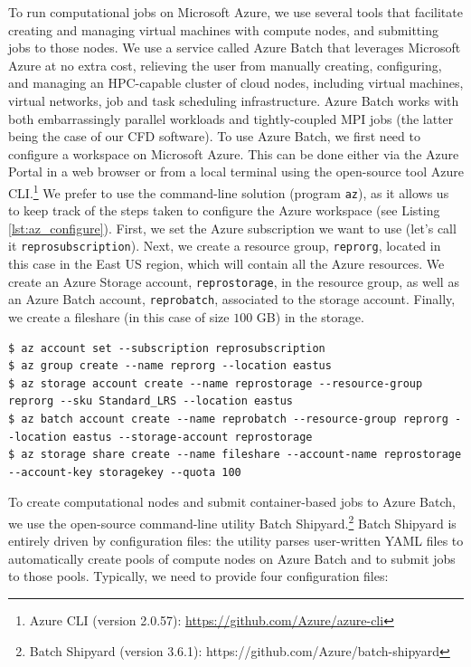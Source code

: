 \documentclass[10pt,journal,compsoc]{IEEEtran}
\begin{document}
To run computational jobs on Microsoft Azure, we use several tools that facilitate creating and managing virtual machines with compute nodes, and submitting jobs to those nodes.
We use a service called Azure Batch that leverages Microsoft Azure at no extra cost, relieving the user from manually creating, configuring, and managing an HPC-capable cluster of cloud nodes, including virtual machines, virtual networks, job and task scheduling infrastructure.
Azure Batch works with both embarrassingly parallel workloads and tightly-coupled MPI jobs (the latter being the case of our CFD software).
To use Azure Batch, we first need to configure a workspace on Microsoft Azure.
This can be done either via the Azure Portal in a web browser or from a local terminal using the open-source tool Azure CLI.\footnote{Azure CLI (version 2.0.57): \url{https://github.com/Azure/azure-cli}}
We prefer to use the command-line solution (program \texttt{az}), as it allows us to keep track of the steps taken to configure the Azure workspace (see Listing \ref{lst:az_configure}).
First, we set the Azure subscription we want to use (let's call it \texttt{reprosubscription}).
Next, we create a resource group, \texttt{reprorg}, located in this case in the East US region, which will contain all the Azure resources.
We create an Azure Storage account, \texttt{reprostorage}, in the resource group, as well as an Azure Batch account, \texttt{reprobatch}, associated to the storage account.
Finally, we create a fileshare (in this case of size $100$ GB) in the storage.

\begin{lstlisting}[label=lst:az_configure,caption={Configure the workspace on Microsoft Azure.}]
$ az account set --subscription reprosubscription
$ az group create --name reprorg --location eastus
$ az storage account create --name reprostorage --resource-group reprorg --sku Standard_LRS --location eastus
$ az batch account create --name reprobatch --resource-group reprorg --location eastus --storage-account reprostorage
$ az storage share create --name fileshare --account-name reprostorage --account-key storagekey --quota 100
\end{lstlisting}

To create computational nodes and submit container-based jobs to Azure Batch, we use the open-source command-line utility Batch Shipyard.\footnote{Batch Shipyard (version 3.6.1): https://github.com/Azure/batch-shipyard}
Batch Shipyard is entirely driven by configuration files: the utility parses user-written YAML files to automatically create pools of compute nodes on Azure Batch and to submit jobs to those pools.
Typically, we need to provide four configuration files:
\end{document}
